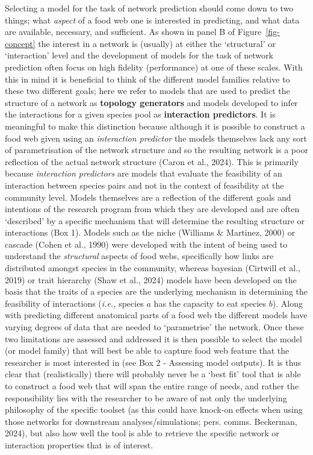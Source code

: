 \documentclass[
]{article}
\begin{document}
Selecting a model for the task of network prediction should come down to
two things; what \emph{aspect} of a food web one is interested in
predicting, and what data are available, necessary, and sufficient. As
shown in panel B of Figure~\ref{fig-concept} the interest in a network
is (usually) at either the `structural' or `interaction' level and the
development of models for the task of network prediction often focus on
high fidelity (performance) at one of these scales. With this in mind it
is beneficial to think of the different model families relative to these
two different goals; here we refer to models that are used to predict
the structure of a network as \textbf{topology generators} and models
developed to infer the interactions for a given species pool as
\textbf{interaction predictors}. It is meaningful to make this
distinction because although it is possible to construct a food web
given using an \emph{interaction predictor} the models themselves lack
any sort of parametrisation of the network structure and so the
resulting network is a poor reflection of the actual network structure
(Caron et al., 2024). This is primarily because \emph{interaction
predictors} are models that evaluate the feasibility of an interaction
between species pairs and not in the context of feasibility at the
community level. Models themselves are a reflection of the different
goals and intentions of the research program from which they are
developed and are often `described' by a specific mechanism that will
determine the resulting structure or interactions (Box 1). Models such
as the niche (Williams \& Martinez, 2000) or cascade (Cohen et al.,
1990) were developed with the intent of being used to understand the
\emph{structural} aspects of food webs, specifically how links are
distributed amongst species in the community, whereas bayesian (Cirtwill
et al., 2019) or trait hierarchy (Shaw et al., 2024) models have been
developed on the basis that the traits of a species are the underlying
mechanism in determining the feasibility of interactions (\emph{i.e.,}
species \(a\) has the capacity to eat species \(b\)). Along with
predicting different anatomical parts of a food web the different models
have varying degrees of data that are needed to `parametrise' the
network. Once these two limitations are assessed and addressed it is
then possible to select the model (or model family) that will best be
able to capture food web feature that the researcher is most interested
in (see Box 2 - Assessing model outputs). It is thus clear that
(realistically) there will probably never be a `best fit' tool that is
able to construct a food web that will span the entire range of needs,
and rather the responsibility lies with the researcher to be aware of
not only the underlying philosophy of the specific toolset (as this
could have knock-on effects when using those networks for downstream
analyses/simulations; pers. comms. Beckerman, 2024), but also how well
the tool is able to retrieve the specific network or interaction
properties that is of interest.
\end{document}
